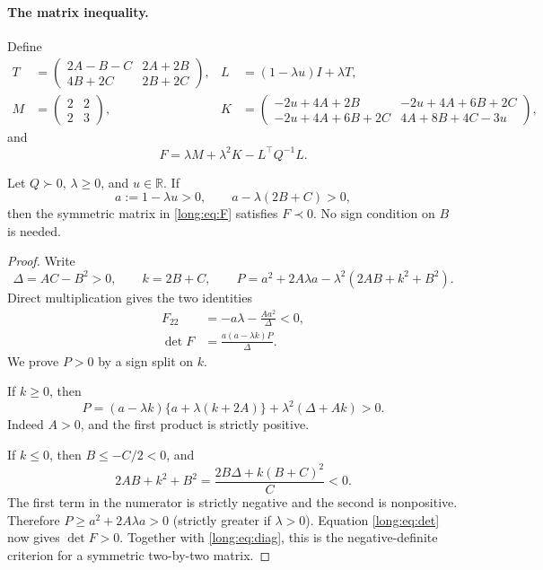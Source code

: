\documentclass[11pt,reqno]{amsart}
\begin{document}
\paragraph{The matrix inequality.}
Define
\begin{align*}
 T&=\begin{pmatrix}
 2A-B-C&2A+2B\\
 4B+2C&2B+2C
 \end{pmatrix},
 &L&=(1-\lambda u)I+\lambda T,\\
 M&=\begin{pmatrix}2&2\\2&3\end{pmatrix},
 &K&=\begin{pmatrix}
 -2u+4A+2B&-2u+4A+6B+2C\\
 -2u+4A+6B+2C&4A+8B+4C-3u
 \end{pmatrix},
\end{align*}
and
\begin{equation}\label{long:eq:F}
 F=\lambda M+\lambda^2K-L^\top Q^{-1}L.
\end{equation}

\begin{thm}\label{long:thm:matrix}
Let $Q\succ0$, $\lambda\ge0$, and $u\in\mathbb R$. If
\[
 a:=1-\lambda u>0,
 \qquad a-\lambda(2B+C)>0,
\]
then the symmetric matrix in \eqref{long:eq:F} satisfies $F\prec0$.
No sign condition on $B$ is needed.
\end{thm}
\begin{proof}
Write
\[
 \Delta=AC-B^2>0,\qquad k=2B+C,
 \qquad P=a^2+2A\lambda a-\lambda^2(2AB+k^2+B^2).
\]
Direct multiplication gives the two identities
\begin{align}
 F_{22}&=-a\lambda-\frac{Aa^2}{\Delta}<0,
 \label{long:eq:diag}\\
 \det F&=\frac{a(a-\lambda k)P}{\Delta}.
 \label{long:eq:det}
\end{align}
We prove $P>0$ by a sign split on $k$.

If $k\ge0$, then
\begin{equation}\label{long:eq:posk}
 P=(a-\lambda k)\{a+\lambda(k+2A)\}
     +\lambda^2(\Delta+Ak)>0.
\end{equation}
Indeed $A>0$, and the first product is strictly positive.

If $k\le0$, then $B\le-C/2<0$, and
\begin{equation}\label{long:eq:negk}
 2AB+k^2+B^2
 =\frac{2B\Delta+k(B+C)^2}{C}<0.
\end{equation}
The first term in the numerator is strictly negative and the second is
nonpositive. Therefore $P\ge a^2+2A\lambda a>0$ (strictly greater if
$\lambda>0$). Equation \eqref{long:eq:det} now gives $\det F>0$.
Together with \eqref{long:eq:diag}, this is the negative-definite criterion for
a symmetric two-by-two matrix.
\end{proof}
\end{document}
